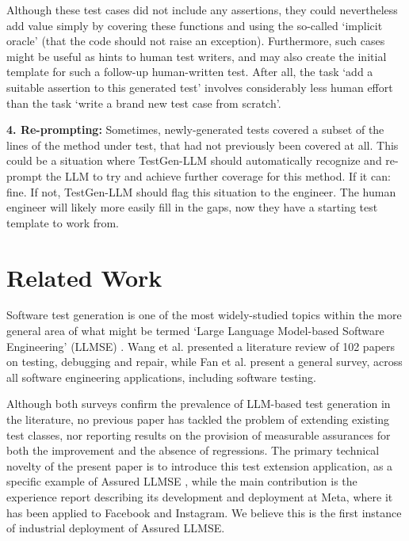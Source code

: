 \documentclass[sigconf,screen]{acmart}
\begin{document}
Although these test cases did not include any assertions, they could nevertheless add value simply by covering these functions and using the so-called `implicit oracle' \cite{ebetal:oracle} (that the code should not raise an exception).
Furthermore, such cases might be  useful as hints to human test writers, and may also create the initial template for such a follow-up human-written test.
After all, the task `add a suitable assertion to this generated test' involves considerably less human effort than
the task `write a brand new test case from scratch'.

\medskip
\noindent
{\bf
4. Re-prompting:}
Sometimes, newly-generated tests covered a subset of the lines of the method under test, that had not previously been covered at all. 
This could be a situation where TestGen-LLM should automatically recognize and re-prompt the LLM to try and achieve further coverage for this method. 
If it can: fine. 
If not, TestGen-LLM should flag this situation  to the engineer. 
The human engineer will likely more easily fill in the gaps, now they have  a starting test template to work from.










\section{Related Work}
Software test generation is one of the most widely-studied topics within the more general area of what might be termed `Large Language Model-based Software Engineering' (LLMSE) \cite{mhetal:LLM-survey}.
Wang et al. \cite{wang:llm-test-survey} presented a  literature review  of  102 papers on testing,  debugging and repair,
while Fan et al. \cite{mhetal:LLM-survey} present a general survey, across all software engineering applications, including software testing.

Although both surveys confirm the prevalence of LLM-based test generation in the literature, 
no previous paper  has tackled the problem of extending existing test classes, nor reporting results on the provision of measurable  assurances for both the improvement and the absence of regressions.
The primary technical novelty of the present paper is to introduce this test extension application, as a specific example of Assured LLMSE \cite{mhetal:intense24-keynote}, while the main contribution is the experience report describing its development and deployment at Meta, where it has been applied to Facebook and Instagram.
We believe this is the first instance of industrial deployment of Assured LLMSE.
\end{document}
